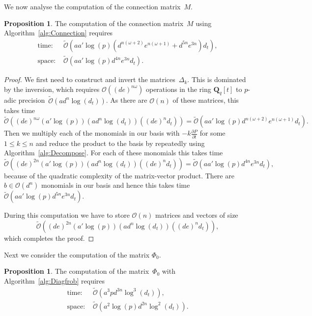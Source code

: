 \documentclass[a4paper,11pt]{article}
\numberwithin{equation}{section}
\newcommand{\QQ}{\mathbf{Q}} %
\providecommand{\BigOh}{\mathcal{O}}          %
\providecommand{\SoftOh}{\tilde{\mathcal{O}}} %
\theoremstyle{definition}
\newtheorem{prop}[thm]{Proposition}
\begin{document}
We now analyse the computation of the connection matrix~$M$.
\begin{prop}
The computation of the connection matrix~$M$ using 
Algorithm~\ref{alg:Connection} requires
\begin{align*}
\mbox{time: }  &\SoftOh(a a' \log(p) (d^{n(\omega+2)} e^{n(\omega+1)}+ d^{5n}e^{3n} ) d_t), \\
\mbox{space: } &\SoftOh(a a' \log(p) d^{4n}e^{3n} d_t).
\end{align*}
\end{prop}

\begin{proof}
We first need to construct and invert the matrices~$\Delta_k$.  This 
is dominated by the inversion, which requires $\BigOh((de)^{n \omega})$ 
operations in the ring $\QQ_q[t]$ to $p$-adic 
precision~$\SoftOh(a d^n \log(d_t))$. As there are $\BigOh(n)$ of 
these matrices, this takes time 
\[
\SoftOh((de)^{n \omega} (a' \log(p)) (a d^n \log(d_t)) ((de)^n d_t)) = 
    \SoftOh(a a' \log(p) d^{n(\omega+2)} e^{n(\omega+1)} d_t).
\]
Then we multiply each of the monomials in our basis with $-k \frac{\partial P}{\partial t}$ 
for some $1 \leq k \leq n$ and reduce the product to the basis by 
repeatedly using Algorithm~\ref{alg:Decompose}.  For each of these 
monomials this takes time 
\[
\SoftOh((de)^{2n} (a' \log(p)) (a d^n \log(d_t)) ((de)^n d_t)) = 
    \SoftOh(a a' \log(p) d^{4n}e^{3n} d_t),
\]
because of the quadratic complexity of the matrix-vector product.  
There are $b \in \BigOh(d^n)$ monomials in our basis and hence this 
takes time $\SoftOh(a a' \log(p) d^{5n}e^{3n} d_t)$.

During this computation we have to store $\BigOh(n)$ matrices 
and vectors of size 
\[
\SoftOh((de)^{2n} (a' \log(p)) (a d^n \log(d_t)) ((de)^n d_t)),
\] 
which completes the proof.
\end{proof}

Next we consider the computation of the matrix $\Phi_0$.

\begin{prop} \label{prop:complexityPhi0}
The computation of the matrix~$\Phi_0$ with Algorithm~\ref{alg:Diagfrob} requires
\begin{align*}
\mbox{time: }  &\SoftOh(a^3 p d^{3n} \log^3(d_t)), \\
\mbox{space: } &\SoftOh(a^2 \log(p) d^{2n} \log^2(d_t)).
\end{align*}
\end{prop}
\end{document}
